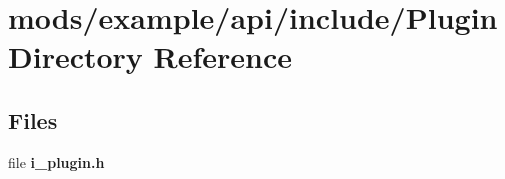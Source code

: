 \section{mods/example/api/include/\+Plugin Directory Reference}
\label{dir_d342676e3f7c6623d34ee8d0be837f13}
\subsection*{Files}
\begin{DoxyCompactItemize}
\item 
file {\bfseries i\+\_\+plugin.\+h}
\end{DoxyCompactItemize}
